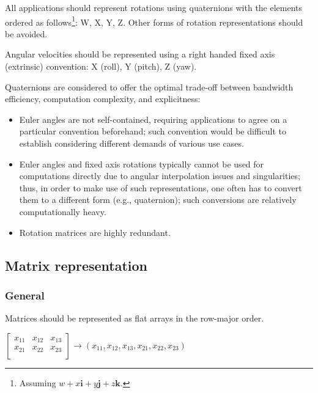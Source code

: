 All applications should represent rotations using quaternions with the elements ordered as follows\footnote{%
    Assuming $w + x\boldsymbol{i} + y\boldsymbol{j} + z\boldsymbol{k}$.
}: W, X, Y, Z.
Other forms of rotation representations should be avoided.

Angular velocities should be represented using a right handed fixed axis (extrinsic) convention:
X (roll), Y (pitch), Z (yaw).

\begin{remark}
    Quaternions are considered to offer the optimal trade-off between bandwidth efficiency,
    computation complexity, and explicitness:
    \begin{itemize}
        \item Euler angles are not self-contained, requiring applications to agree on a particular
        convention beforehand; such convention would be difficult to establish considering different
        demands of various use cases.

        \item Euler angles and fixed axis rotations typically cannot be used for computations directly
        due to angular interpolation issues and singularities; thus, in order to make use of such
        representations, one often has to convert them to a different form (e.g., quaternion);
        such conversions are relatively computationally heavy.

        \item Rotation matrices are highly redundant.
    \end{itemize}
\end{remark}

\subsection{Matrix representation}

\subsubsection{General}

Matrices should be represented as flat arrays in the row-major order.

\begin{remark}
    $
    \begin{bmatrix}
        x_{11} & x_{12} & x_{13} \\
        x_{21} & x_{22} & x_{23} \\
    \end{bmatrix} \rightarrow \left(x_{11}, x_{12}, x_{13}, x_{21}, x_{22}, x_{23}\right)
    $
\end{remark}

